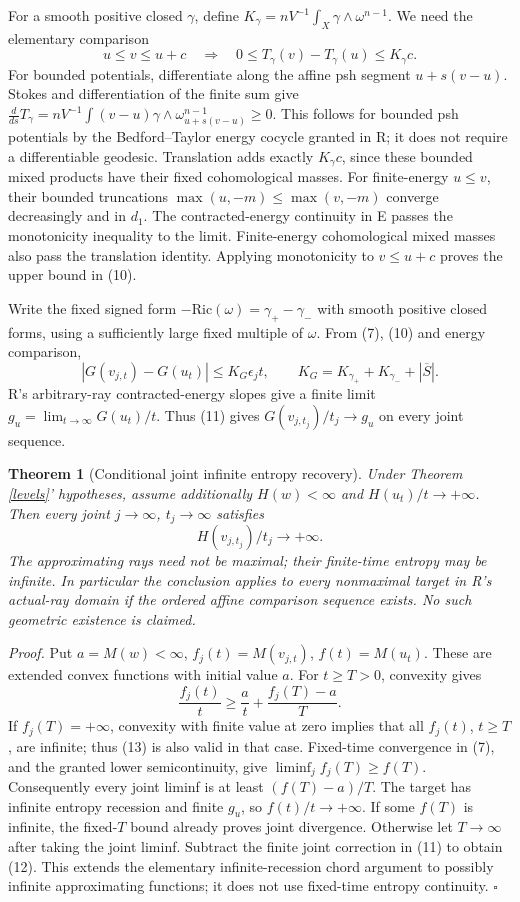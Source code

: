 \documentclass[
  11pt,
]{article}
\newtheorem{theorem}{Theorem}
\begin{document}
For a smooth positive closed \(\gamma\), define
\(K_\gamma=nV^{-1}\int_X\gamma\wedge\omega^{n-1}\). We need the
elementary comparison \[
u\le v\le u+c\quad\Longrightarrow\quad
0\le T_\gamma(v)-T_\gamma(u)\le K_\gamma c.             \tag{10}
\] For bounded potentials, differentiate along the affine psh segment
\(u+s(v-u)\). Stokes and differentiation of the finite sum give
\(\frac{d}{ds}T_\gamma=nV^{-1}\int(v-u)\gamma\wedge
\omega_{u+s(v-u)}^{n-1}\ge0\). This follows for bounded psh potentials
by the Bedford--Taylor energy cocycle granted in R; it does not require
a differentiable geodesic. Translation adds exactly \(K_\gamma c\),
since these bounded mixed products have their fixed cohomological
masses. For finite-energy \(u\le v\), their bounded truncations
\(\max(u,-m)\le\max(v,-m)\) converge decreasingly and in \(d_1\). The
contracted-energy continuity in E passes the monotonicity inequality to
the limit. Finite-energy cohomological mixed masses also pass the
translation identity. Applying monotonicity to \(v\le u+c\) proves the
upper bound in (10).

Write the fixed signed form \(-\mathrm{Ric}(\omega)=
\gamma_+-\gamma_-\) with smooth positive closed forms, using a
sufficiently large fixed multiple of \(\omega\). From (7), (10) and
energy comparison, \[
|G(v_{j,t})-G(u_t)|\le K_G\epsilon_jt,
\qquad K_G=K_{\gamma_+}+K_{\gamma_-}+|\overline S|.       \tag{11}
\] R's arbitrary-ray contracted-energy slopes give a finite limit
\(g_u=\lim_{t\to\infty}G(u_t)/t\). Thus (11) gives
\(G(v_{j,t_j})/t_j\to g_u\) on every joint sequence.

\begin{theorem}[Conditional joint infinite entropy recovery]
\label{entropy}
Under Theorem \ref{levels}' hypotheses, assume additionally
$H(w)<\infty$ and $H(u_t)/t\to+\infty$. Then every joint
$j\to\infty$, $t_j\to\infty$ satisfies
\[
H(v_{j,t_j})/t_j\longrightarrow+\infty.                 \tag{12}
\]
The approximating rays need not be maximal; their finite-time entropy
may be infinite. In particular the conclusion applies to every
nonmaximal target in R's actual-ray domain if the ordered affine
comparison sequence exists. No such geometric existence is claimed.
\end{theorem}

\emph{Proof.} Put \(a=M(w)<\infty\), \(f_j(t)=M(v_{j,t})\),
\(f(t)=M(u_t)\). These are extended convex functions with initial value
\(a\). For \(t\ge T>0\), convexity gives \[
\frac{f_j(t)}t\ge\frac a t+\frac{f_j(T)-a}T.             \tag{13}
\] If \(f_j(T)=+\infty\), convexity with finite value at zero implies
that all \(f_j(t)\), \(t\ge T\), are infinite; thus (13) is also valid
in that case. Fixed-time convergence in (7), and the granted lower
semicontinuity, give \(\liminf_j f_j(T)\ge f(T)\). Consequently every
joint liminf is at least \((f(T)-a)/T\). The target has infinite entropy
recession and finite \(g_u\), so \(f(t)/t\to+\infty\). If some \(f(T)\)
is infinite, the fixed-\(T\) bound already proves joint divergence.
Otherwise let \(T\to\infty\) after taking the joint liminf. Subtract the
finite joint correction in (11) to obtain (12). This extends the
elementary infinite-recession chord argument to possibly infinite
approximating functions; it does not use fixed-time entropy continuity.
\(\square\)
\end{document}
